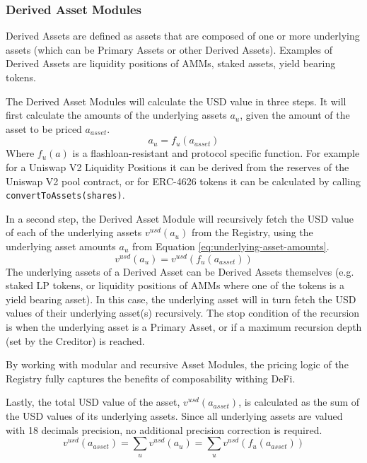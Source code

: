 \documentclass[sigconf,nonacm]{acmart}
\begin{document}
\subsubsection{Derived Asset Modules}
Derived Assets are defined as assets that are composed of one or more underlying assets (which can be Primary Assets or other Derived Assets).
Examples of Derived Assets are liquidity positions of AMMs, staked assets, yield bearing tokens.

The Derived Asset Modules will calculate the USD value in three steps.
It will first calculate the amounts of the underlying assets $a_{u}$, given the amount of the asset to be priced $a_{asset}$.
\begin{equation}
    \label{eq:underlying-asset-amounts}
    a_{u} = f_{u}(a_{asset})
\end{equation}
Where $f_{u}(a)$ is a flashloan-resistant and protocol specific function.
For example for a Uniswap V2 Liquidity Positions it can be derived from the reserves of the Uniswap V2 pool contract,
or for ERC-4626 tokens it can be calculated by calling \texttt{convertToAssets(shares)}.

In a second step, the Derived Asset Module will recursively fetch the USD value of each of the underlying assets $v^{usd}(a_{u})$ from the Registry,
using the underlying asset amounts $a_{u}$ from Equation \ref{eq:underlying-asset-amounts}.
\begin{equation}
    v^{usd}(a_{u}) = v^{usd}(f_{u}(a_{asset}))
\end{equation}
The underlying assets of a Derived Asset can be Derived Assets themselves (e.g. staked LP tokens, or liquidity positions of AMMs where one of the tokens is a yield bearing asset).
In this case, the underlying asset will in turn fetch the USD values  of their underlying asset(s) recursively.
The stop condition of the recursion is when the underlying asset is a Primary Asset, or if a maximum recursion depth (set by the Creditor) is reached.

By working with modular and recursive Asset Modules, the pricing logic of the Registry fully captures the benefits of composability withing DeFi.

Lastly, the total USD value of the asset, $v^{usd}(a_{asset})$, is calculated as the sum of the USD values of its underlying assets.
Since all underlying assets are valued with 18 decimals precision, no additional precision correction is required.
\begin{equation}
    v^{usd}(a_{asset}) = \sum_{u}{v^{usd}(a_{u})} = \sum_{u}{v^{usd}(f_{u}(a_{asset}))}
\end{equation}
\end{document}
